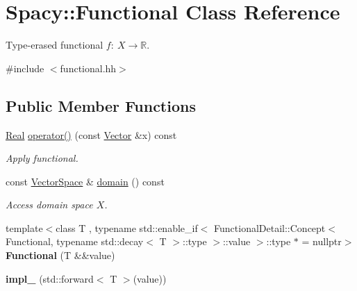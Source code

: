 \hypertarget{classSpacy_1_1Functional}{\section{\-Spacy\-:\-:\-Functional \-Class \-Reference}
\label{classSpacy_1_1Functional}
}


\-Type-\/erased functional $f:\ X \to \mathbb{R} $.  




{\ttfamily \#include $<$functional.\-hh$>$}

\subsection*{\-Public \-Member \-Functions}
\begin{DoxyCompactItemize}
\item 
\hypertarget{classSpacy_1_1Functional_af51f903133f2fbf92cf12f790e429919}{\hyperlink{classSpacy_1_1Real}{\-Real} \hyperlink{classSpacy_1_1Functional_af51f903133f2fbf92cf12f790e429919}{operator()} (const \hyperlink{classSpacy_1_1Vector}{\-Vector} \&x) const }\label{classSpacy_1_1Functional_af51f903133f2fbf92cf12f790e429919}

\begin{DoxyCompactList}\small\item\em \-Apply functional. \end{DoxyCompactList}\item 
\hypertarget{classSpacy_1_1Functional_a6f4ada552c025579bcce852316a071be}{const \hyperlink{classSpacy_1_1VectorSpace}{\-Vector\-Space} \& \hyperlink{classSpacy_1_1Functional_a6f4ada552c025579bcce852316a071be}{domain} () const }\label{classSpacy_1_1Functional_a6f4ada552c025579bcce852316a071be}

\begin{DoxyCompactList}\small\item\em \-Access domain space $X$. \end{DoxyCompactList}\item 
\hypertarget{classSpacy_1_1Functional_a7cda76dbec505fdf667e6023c064bde9}{{\footnotesize template$<$class T , typename std\-::enable\-\_\-if$<$ Functional\-Detail\-::\-Concept$<$ Functional, typename std\-::decay$<$ T $>$\-::type $>$\-::value $>$\-::type $\ast$  = nullptr$>$ }\\{\bfseries \-Functional} (\-T \&\&value)}\label{classSpacy_1_1Functional_a7cda76dbec505fdf667e6023c064bde9}

\item 
\hypertarget{classSpacy_1_1Functional_a286cf483d7cf2f63f022405406508e2a}{{\bfseries impl\-\_\-} (std\-::forward$<$ \-T $>$(value))}\label{classSpacy_1_1Functional_a286cf483d7cf2f63f022405406508e2a}


\end{DoxyCompactItemize}
